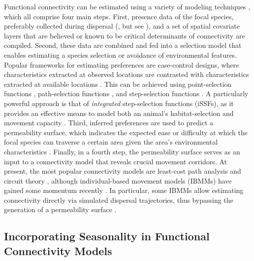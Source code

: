 \documentclass[abstract=on,10pt,a4paper,bibliography=totocnumbered]{article}
\begin{document}
Functional connectivity can be estimated using a variety of modeling techniques
\citep{Diniz.2019}, which all comprise four main steps. First, presence data of
the focal species, preferably collected during dispersal (\citealp{Elliot.2014,
Vasudev.2015, Benz.2016}, but see \citealp{Fattebert.2015}), and a set of
spatial covariate layers that are believed or known to be critical determinants
of connectivity are compiled. Second, these data are combined and fed into a
selection model that enables estimating a species selection or avoidance of
environmental features. Popular frameworks for estimating preferences are
case-control designs, where characteristics extracted at observed locations are
contrasted with characteristics extracted at available locations
\citep{Beyer.2010, Fieberg.2010}. This can be achieved using point-selection
functions \citep{Boyce.2002, Manly.2007}, path-selection functions
\citep{Cushman.2010}, and step-selection functions \citep{Fortin.2005,
Thurfjell.2014}. A particularly powerful approach is that of \textit{integrated}
step-selection functions (iSSFs), as it provides an effective means to model
both an animal's habitat-selection and movement capacity \citep{Avgar.2016,
Fieberg.2021}. Third, inferred preferences are used to predict a permeability
surface, which indicates the expected ease or difficulty at which the focal
species can traverse a certain area given the area's environmental
characteristics \citep{Zeller.2012}. Finally, in a fourth step, the permeability
surface serves as an input to a connectivity model that reveals crucial movement
corridors. At present, the most popular connectivity models are least-cost path
analysis \citep{Adriaensen.2003} and circuit theory \citep{McRae.2008}, although
individual-based movement models (IBMMs) have gained some momentum recently
\citep{Kanagaraj.2013, Allen.2016, Hauenstein.2019, Zeller.2020,
UnnithanKumar.2022a, UnnithanKumar.2022, Hofmann.2023}. In particular, some
IBMMs allow estimating connectivity directly via simulated dispersal
trajectories, thus bypassing the generation of a permeability surface
\citep{UnnithanKumar.2022a, Hofmann.2023}.

\subsection{Incorporating Seasonality in Functional Connectivity Models}
\end{document}
